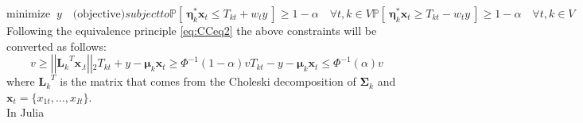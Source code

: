 \begin{subequations}
\begin{equation}
	\mbox{minimize } \ y \quad \mbox{(objective)}
\end{equation}	
	subject to
\begin{equation}\label{eq:CC1}
\mathbb{P} \left[ \ \boldsymbol{\eta}^*_{k} \boldsymbol{x}_{t}  \leq T_{kt} + w_t y \ \right ] \geq 1- \alpha
\quad \forall t,k \in V \end{equation}
\begin{equation}\label{eq:CC2}
\mathbb{P} \left[ \ \boldsymbol{\eta}^*_{k} \boldsymbol{x}_{t}  \geq T_{kt} - w_t y \ \right] \geq 1- \alpha \quad \forall t,k \in V
\end{equation}
\end{subequations}
Following the equivalence principle \eqref{eq:CCeq2} the above constraints will be converted as follows:
\begin{subequations}
	\begin{equation}
	v \geq \left| \left| {\boldsymbol{L}_k}^T \boldsymbol{x}_{.t}\right| \right| {}_2 
	\end{equation}
	\begin{equation}
	T_{kt} + y -\boldsymbol{\mu}_k \boldsymbol{x}_{t} \geq \Phi^{-1}(1-\alpha)v
	\end{equation}
	\begin{equation}
		T_{kt} - y  -\boldsymbol{\mu}_k \boldsymbol{x}_{t} \leq \Phi^{-1}(\alpha)v
	\end{equation}

	\label{eq:CCeqTIF}
\end{subequations}
where ${\boldsymbol{L}_k}^T$ is the matrix that comes from the Choleski decomposition of $\boldsymbol{\Sigma}_k$ and $\boldsymbol{x}_{t}=\{x_{1t},\ldots,x_{It}\}$. \\
In Julia

